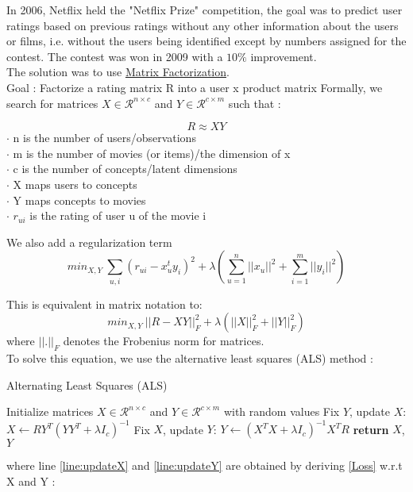 \documentclass{article}
\begin{document}
In 2006, Netflix held the "Netflix Prize" competition, the goal was to predict user ratings based on previous ratings without any other information about the users or films, i.e. without the users being identified except by numbers assigned for the contest. The contest was won in 2009 with a $10\%$ improvement. \\
The solution was to use \href{https://developers.google.com/machine-learning/recommendation/collaborative/matrix}{Matrix Factorization}. \\
Goal : Factorize a rating matrix R into a user x product matrix
Formally, we search for matrices $X \in \mathcal{R}^{n \times c}$ and $Y \in \mathcal{R}^{c \times m}$ such that :

\begin{equation}
    R \approx X Y
\end{equation}
$\cdot$ n is the number of users/observations \\
$\cdot$ m is the number of movies (or items)/the dimension of x \\
$\cdot$ c is the number of concepts/latent dimensions \\
$\cdot$ X maps users to concepts \\
$\cdot$ Y maps concepts to movies \\
$\cdot$ $r_{ui}$ is the rating of user u of the movie i

We also add a regularization term
\begin{equation*}
    min_{X,Y} \ \sum_{u,i} (r_{ui}-x_u^t y_i)^2 + \lambda(\sum_{u=1}^n ||x_u||^2 + \sum_{i=1}^m ||y_i||^2)
\end{equation*}

This is equivalent in matrix notation to:
\begin{equation}
    min_{X,Y} \ ||R-XY||_F^2 + \lambda (||X||_F^2 + ||Y||_F^2) \label{Loss}
\end{equation}
where $||.||_F$ denotes the Frobenius norm for matrices. \\
To solve this equation, we use the alternative least squares (ALS) method :

\begin{algorithm}
\caption{Alternating Least Squares (ALS)}\label{als}
\begin{algorithmic}[1]
    \State Initialize matrices $X \in \mathcal{R}^{n \times c}$ and $Y \in \mathcal{R}^{c \times m}$ with random values
        \State Fix $Y$, update $X$:
        \State $X \gets RY^T (YY^T + \lambda I_{c})^{-1}$ \label{line:updateX}
        \State Fix $X$, update $Y$:
        \State $Y \gets (X^TX + \lambda I_{c})^{-1} X^TR$ \label{line:updateY}
    \EndWhile
    \State \textbf{return} $X$, $Y$
\EndProcedure
\end{algorithmic}
\end{algorithm}
where line \ref{line:updateX} and \ref{line:updateY} are obtained by deriving \eqref{Loss} w.r.t X and Y :
\end{document}
